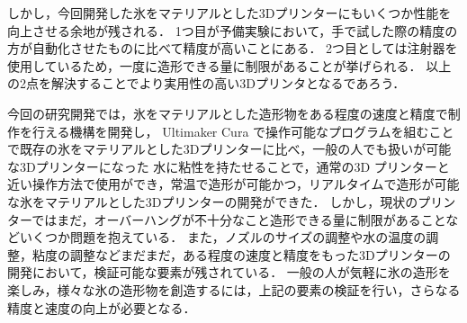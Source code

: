 しかし，今回開発した氷をマテリアルとした3Dプリンターにもいくつか性能を向上させる余地が残される．
1つ目が予備実験において，手で試した際の精度の方が自動化させたものに比べて精度が高いことにある．
2つ目としては注射器を使用しているため，一度に造形できる量に制限があることが挙げられる．
以上の2点を解決することでより実用性の高い3Dプリンタとなるであろう．

今回の研究開発では，氷をマテリアルとした造形物をある程度の速度と精度で制作を行える機構を開発し， Ultimaker Cura で操作可能なプログラムを組むことで既存の氷をマテリアルとした3Dプリンターに比べ，一般の人でも扱いが可能な3Dプリンターになった
水に粘性を持たせることで，通常の3D プリンターと近い操作方法で使用ができ，常温で造形が可能かつ，リアルタイムで造形が可能な氷をマテリアルとした3Dプリンターの開発ができた．
しかし，現状のプリンターではまだ，オーバーハングが不十分なこと造形できる量に制限があることなどいくつか問題を抱えている．
また，ノズルのサイズの調整や水の温度の調整，粘度の調整などまだまだ，ある程度の速度と精度をもった3Dプリンターの開発において，検証可能な要素が残されている．
一般の人が気軽に氷の造形を楽しみ，様々な氷の造形物を創造するには，上記の要素の検証を行い，さらなる精度と速度の向上が必要となる．









